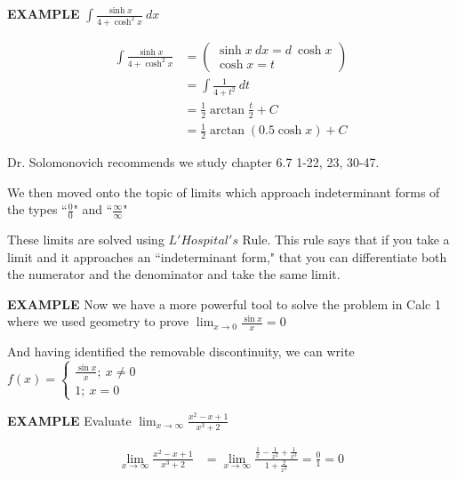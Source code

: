 \documentclass{article}
\begin{document}
\newpage

{\bf{}EXAMPLE} $\displaystyle\int\frac{\sinh x}{4+\cosh^2x}\ dx$

\begin{align*}
\int\frac{\sinh x}{4+\cosh^2x}&=\left(\begin{array}{l}
\sinh x\ dx=d\ \cosh x\\
\cosh x=t\end{array}\right)\\
&=\int\frac{1}{4+t^2}\ dt\\
&=\frac{1}{2}\arctan\frac{t}{2}+C\\
&=\frac{1}{2}\arctan(0.5\cosh x)+C
\end{align*}

\vspace{10pt}

Dr. Solomonovich recommends we study chapter 6.7 1-22, 23, 30-47.

\vspace{10pt}

We then moved onto the topic of limits which approach indeterminant forms of the types ``$\frac{0}{0}$" and ``$\frac{\infty}{\infty}$"

\vspace{10pt}

These limits are solved using $L'Hospital's$ Rule. This rule says that if you take a limit and it approaches an ``indeterminant form," that you can differentiate both the numerator and the denominator and take the same limit.

\vspace{10pt}

{\bf{}EXAMPLE} Now we have a more powerful tool to solve the problem in Calc 1 where we used geometry to prove $\displaystyle\lim_{x\to0}\frac{\sin x}{x}=0$

\vspace{10pt}

And having identified the removable discontinuity, we can write $f(x)=\left\{\begin{array}{c}\frac{\sin x}{x};\ x\neq0\\1;\ x=0\end{array}\right.$

\vspace{10pt}

{\bf{}EXAMPLE} Evaluate $\displaystyle\lim_{x\to\infty}\frac{x^2-x+1}{x^3+2}$

\begin{align*}
\lim_{x\to\infty}\frac{x^2-x+1}{x^3+2}&=\lim_{x\to\infty}\frac{\frac{1}{x}-\frac{1}{x^2}+\frac{1}{x^3}}{1+\frac{2}{x^3}}=\frac{0}{1}=0
\end{align*}
\end{document}
